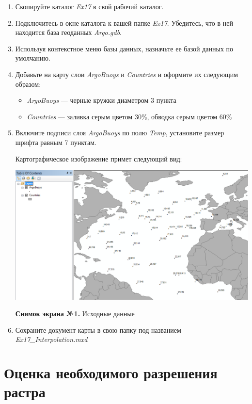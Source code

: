 \documentclass[12pt,]{book}
\providecommand{\tightlist}{%
  \setlength{\itemsep}{0pt}\setlength{\parskip}{0pt}}
\begin{document}
\begin{enumerate}
\def\labelenumi{\arabic{enumi}.}
\item
  Скопируйте каталог \emph{Ex17} в свой рабочий каталог.
\item
  Подключитесь в окне каталога к вашей папке \emph{Ex17}. Убедитесь, что в ней находится база геоданных \emph{Argo.gdb}.
\item
  Используя контекстное меню базы данных, назначьте ее базой данных по умолчанию.
\item
  Добавьте на карту слои \emph{ArgoBuoys} и \emph{Countries} и оформите их следующим образом:

  \begin{itemize}
  \tightlist
  \item
    \emph{ArgoBuoys} --- черные кружки диаметром 3 пункта
  \item
    \emph{Countries} --- заливка серым цветом 30\%, обводка серым цветом 60\%
  \end{itemize}
\item
  Включите подписи слоя \emph{ArgoBuoys} по полю \emph{Temp}, установите размер шрифта равным 7 пунктам.

  Картографическое изображение примет следующий вид:

  \includegraphics{images/Ex17/image7.png}

  \textbf{Снимок экрана №1.} Исходные данные
\item
  Сохраните документ карты в свою папку под названием \emph{Ex17\_Interpolation.mxd}
\end{enumerate}

\hypertarget{interpolation-resolution}{%
\section{Оценка необходимого разрешения растра}\label{interpolation-resolution}}
\end{document}
